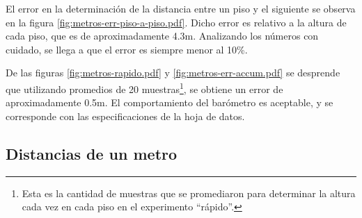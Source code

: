 \documentclass[main]{subfiles}
\begin{document}
El error en la determinación de la distancia entre un piso y el siguiente se observa en la figura \ref{fig:metros-err-piso-a-piso.pdf}. Dicho error es relativo a la altura de cada piso, que es de aproximadamente 4.3m. Analizando los números con cuidado, se llega a que el error es siempre menor al 10\%.

De las figuras \ref{fig:metros-rapido.pdf} y \ref{fig:metros-err-accum.pdf} se desprende que utilizando promedios de 20 muestras\footnote{Esta es la cantidad de muestras que se promediaron para determinar la altura cada vez en cada piso en el experimento ``rápido''.}, se obtiene un error de aproximadamente 0.5m. El comportamiento del barómetro es aceptable, y se corresponde con las especificaciones de la hoja de datos.


\vspace{-10pt}
\begin{figure}[h!]
\centering
{}
  \caption{}
\vspace{-20pt}
\end{figure}

\subsection{Distancias de un metro}
\end{document}
